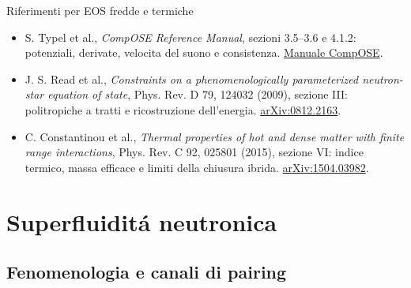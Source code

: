 \begin{frame}[t]{Riferimenti per EOS fredde e termiche}
\vspace*{3mm}
\small
\begin{itemize}
\item S. Typel et al., \emph{CompOSE Reference Manual}, sezioni 3.5--3.6
e 4.1.2: potenziali, derivate, velocita del suono e consistenza.
\href{https://compose.obspm.fr/download/pdf/manual_v3.00.pdf}{Manuale CompOSE}.
\item J. S. Read et al., \emph{Constraints on a phenomenologically
parameterized neutron-star equation of state}, Phys. Rev. D 79, 124032 (2009),
sezione III: politropiche a tratti e ricostruzione dell'energia.
\href{https://arxiv.org/abs/0812.2163}{arXiv:0812.2163}.
\item C. Constantinou et al., \emph{Thermal properties of hot and dense
matter with finite range interactions}, Phys. Rev. C 92, 025801 (2015),
sezione VI: indice termico, massa efficace e limiti della chiusura ibrida.
\href{https://arxiv.org/abs/1504.03982}{arXiv:1504.03982}.
\end{itemize}
\end{frame}

\section{Superfluidit\'a neutronica}

\subsection{Fenomenologia e canali di pairing}

